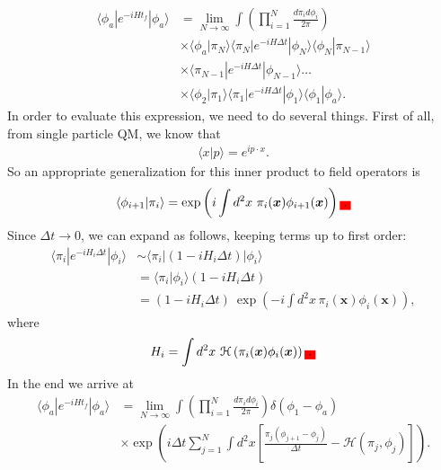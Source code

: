         \begin{align}
            \langle \phi_a| e^{- i H t_f} | \phi_a \rangle &= \lim_{N\rightarrow \infty} \int \left( \prod_{i=1}^{N} \frac{d\pi_i d\phi_i}{2\pi} \right) \nonumber \\
            &\times \langle \phi_a | \pi_N \rangle \langle \pi_N|  e^{-i H \Delta t}| \phi_N \rangle \langle \phi_N | \pi_{N-1} \rangle \nonumber \\
            &\times \langle \pi_{N-1} | e^{-i H \Delta t} | \phi_{N-1} \rangle \dots \nonumber \\
            &\times \langle \phi_2 | \pi_1 \rangle \langle \pi_1 | e^{-i H \Delta t} | \phi_1 \rangle \langle \phi_1 |\phi_a \rangle.
        \end{align}
        In order to evaluate this expression, we need to do several things. First of all, from single particle QM, we know that 
        \begin{align}
            \langle x | p \rangle = e^{i p \cdot x}.
        \end{align}
        So an appropriate generalization for this inner product to field operators is 
        \begin{align}
            \langle \phi_{i+1}| \pi_i \rangle = \exp \left(i \int d^2 x \ \pi_i(\bm{x}) \phi_{i+1}(\bm{x}) \right)\colorbox{red}{.}
        \end{align}
        Since $\Delta t \rightarrow 0$, we can expand as follows, keeping terms up to first order:
        \begin{align}
            \langle \pi_i | e^{-i H_i \Delta t} | \phi_i \rangle &\sim \langle \pi_i | (1- i H_i \Delta t ) | \phi_i \rangle \nonumber \\
            &= \langle \pi_i | \phi_i \rangle (1 - i H_i \Delta t) \nonumber \\
            & = (1-i H_i \Delta t) \ \exp\left(-i \int d^2x \, \pi_i(\bm{x}) \phi_i (\bm{x})  \right),
        \end{align}
        where
        \begin{align}
            H_i = \int d^2 x \ \mathcal{H}\left(\pi_i (\bm{x}) \phi_i (\bm{x}) \right) \colorbox{red}{.}
        \end{align}
        In the end we arrive at 
        \begin{align}
            \langle \phi_a | e^{-i H t_f} | \phi_a \rangle &= \lim_{N\rightarrow \infty} \int \left( \prod_{i=1}^N \frac{d \pi_i d\phi_i}{2\pi} \right) \delta \left(\phi_1 -\phi_a \right) \nonumber \\
            &\times \exp \left(i \Delta t \sum_{j=1}^{N} \int d^2x \left[\frac{\pi_j (\phi_{j+1} -\phi_j)}{\Delta t} - \mathcal{H}(\pi_j, \phi_j) \right] \right).
        \end{align}
